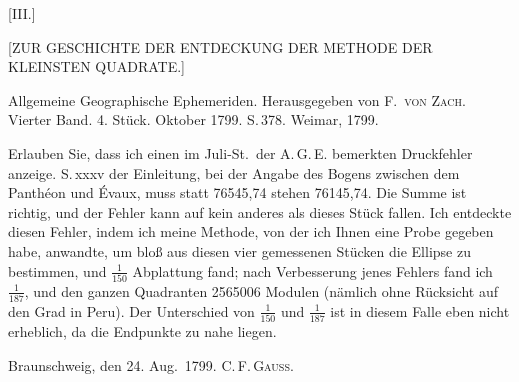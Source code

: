 \clearpage
{}
\begin{center}
[III.]

{[ZUR GESCHICHTE DER ENTDECKUNG DER METHODE DER\\
KLEINSTEN QUADRATE.]}
\end{center}

\begin{center}
Allgemeine Geographische Ephemeriden. Herausgegeben von F.\ \textsc{von Zach}.\\
Vierter Band. 4. Stück. Oktober 1799. S.\,378. Weimar, 1799.
\end{center}

Erlauben Sie, dass ich einen im Juli-St.\ der A.\,G.\,E. bemerkten Druckfehler anzeige. S.\,xxxv der Einleitung, bei der Angabe des Bogens zwischen dem Panthéon und Évaux, muss statt 76545,74 stehen 76145,74. Die Summe ist richtig, und der Fehler kann auf kein anderes als dieses Stück fallen. Ich entdeckte diesen Fehler, indem ich meine Methode, von der ich Ihnen eine Probe gegeben habe, anwandte, um bloß aus diesen vier gemessenen Stücken die Ellipse zu bestimmen, und $\frac{1}{150}$ Abplattung fand; nach Verbesserung jenes Fehlers fand ich $\frac{1}{187}$, und den ganzen Quadranten 2565006 Modulen (nämlich ohne Rücksicht auf den Grad in Peru). Der Unterschied von $\frac{1}{150}$ und $\frac{1}{187}$ ist in diesem Falle eben nicht erheblich, da die Endpunkte zu nahe liegen.

\bigskip
\noindent Braunschweig, den 24. Aug.\ 1799. \hfill C.\,F.\,\textsc{Gauss}.

